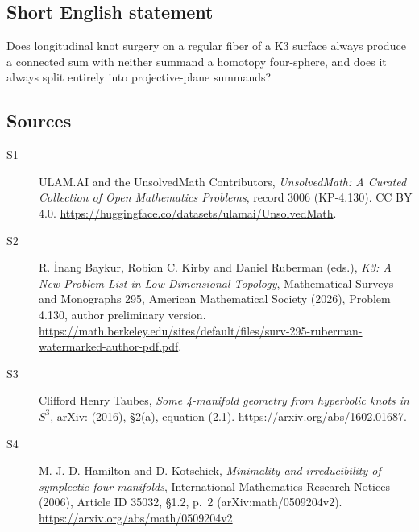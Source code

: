 \documentclass[11pt]{article}
\begin{document}
\subsection{Short English statement}
Does longitudinal knot surgery on a regular fiber of a K3 surface always produce a connected sum with neither summand a homotopy four-sphere, and does it always split entirely into projective-plane summands?
\subsection{Sources}
\begin{description}
\item[\hypertarget{source:3006:1}{S1}] ULAM.AI and the UnsolvedMath Contributors, \emph{UnsolvedMath: A Curated Collection of Open Mathematics Problems}, record 3006 (KP-4.130). CC BY 4.0. \url{https://huggingface.co/datasets/ulamai/UnsolvedMath}.
\item[\hypertarget{source:3006:2}{S2}] R. İnanç Baykur, Robion C. Kirby and Daniel Ruberman (eds.), \emph{K3: A New Problem List in Low-Dimensional Topology}, Mathematical Surveys and Monographs 295, American Mathematical Society (2026), Problem 4.130, author preliminary version. \url{https://math.berkeley.edu/sites/default/files/surv-295-ruberman-watermarked-author-pdf.pdf}.
\item[\hypertarget{source:3006:3}{S3}] Clifford Henry Taubes, \emph{Some 4-manifold geometry from hyperbolic knots in $S^3$}, arXiv: (2016), §2(a), equation (2.1). \url{https://arxiv.org/abs/1602.01687}.
\item[\hypertarget{source:3006:4}{S4}] M. J. D. Hamilton and D. Kotschick, \emph{Minimality and irreducibility of symplectic four-manifolds}, International Mathematics Research Notices (2006), Article ID 35032, §1.2, p.~2 (arXiv:math/0509204v2). \url{https://arxiv.org/abs/math/0509204v2}.
\end{description}
\label{end:3006}
\end{document}
